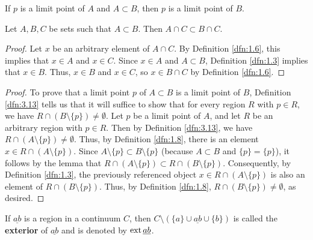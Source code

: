 \documentclass[../main.tex]{subfiles}
\begin{document}
\begin{theorem}\label{trm:3.14}
    If $p$ is a limit point of $A$ and $A\subset B$, then $p$ is a limit point of $B$.
    \begin{lemma*}
        Let $A,B,C$ be sets such that $A\subset B$. Then $A\cap C\subset B\cap C$.
        \begin{proof}
            Let $x$ be an arbitrary element of $A\cap C$. By Definition \ref{dfn:1.6}, this implies that $x\in A$ and $x\in C$. Since $x\in A$ and $A\subset B$, Definition \ref{dfn:1.3} implies that $x\in B$. Thus, $x\in B$ and $x\in C$, so $x\in B\cap C$ by Definition \ref{dfn:1.6}.
        \end{proof}
    \end{lemma*}
    \begin{proof}
        To prove that a limit point $p$ of $A\subset B$ is a limit point of $B$, Definition \ref{dfn:3.13} tells us that it will suffice to show that for every region $R$ with $p\in R$, we have $R\cap(B\setminus\{p\})\neq\emptyset$. Let $p$ be a limit point of $A$, and let $R$ be an arbitrary region with $p\in R$. Then by Definition \ref{dfn:3.13}, we have $R\cap(A\setminus\{p\})\neq\emptyset$. Thus, by Definition \ref{dfn:1.8}, there is an element $x\in R\cap(A\setminus\{p\})$. Since $A\setminus\{p\}\subset B\setminus\{p\}$ (because $A\subset B$ and $\{p\}=\{p\}$), it follows by the lemma that $R\cap(A\setminus\{p\})\subset R\cap(B\setminus\{p\})$. Consequently, by Definition \ref{dfn:1.3}, the previously referenced object $x\in R\cap(A\setminus\{p\})$ is also an element of $R\cap(B\setminus\{p\})$. Thus, by Definition \ref{dfn:1.8}, $R\cap(B\setminus\{p\})\neq\emptyset$, as desired.
    \end{proof}
\end{theorem}

\begin{definition}\label{dfn:3.15}
    If $\underline{ab}$ is a region in a continuum $C$, then $C\setminus(\{a\}\cup\underline{ab}\cup\{b\})$ is called the \textbf{exterior} of $\underline{ab}$ and is denoted by $\operatorname{ext}\underline{ab}$.
\end{definition}
\end{document}
